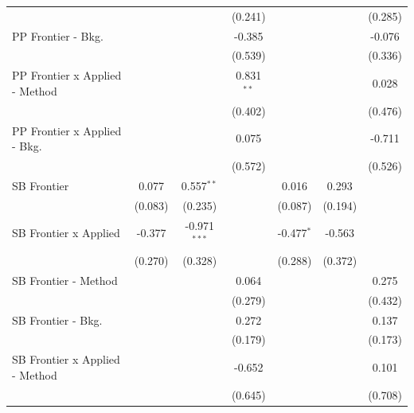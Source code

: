 \begin{tabular}{lcccccc}
                                  &               &                & (0.241)        &              &         & (0.285)\\   
   PP Frontier - Bkg.             &               &                & -0.385         &              &         & -0.076\\   
                                  &               &                & (0.539)        &              &         & (0.336)\\   
   PP Frontier x Applied - Method &               &                & 0.831$^{**}$   &              &         & 0.028\\   
                                  &               &                & (0.402)        &              &         & (0.476)\\   
   PP Frontier x Applied - Bkg.   &               &                & 0.075          &              &         & -0.711\\   
                                  &               &                & (0.572)        &              &         & (0.526)\\   
   SB Frontier                    & 0.077         & 0.557$^{**}$   &                & 0.016        & 0.293   &   \\   
                                  & (0.083)       & (0.235)        &                & (0.087)      & (0.194) &   \\   
   SB Frontier x Applied          & -0.377        & -0.971$^{***}$ &                & -0.477$^{*}$ & -0.563  &   \\   
                                  & (0.270)       & (0.328)        &                & (0.288)      & (0.372) &   \\   
   SB Frontier - Method           &               &                & 0.064          &              &         & 0.275\\   
                                  &               &                & (0.279)        &              &         & (0.432)\\   
   SB Frontier - Bkg.             &               &                & 0.272          &              &         & 0.137\\   
                                  &               &                & (0.179)        &              &         & (0.173)\\   
   SB Frontier x Applied - Method &               &                & -0.652         &              &         & 0.101\\   
                                  &               &                & (0.645)        &              &         & (0.708)\\   

\end{tabular}
